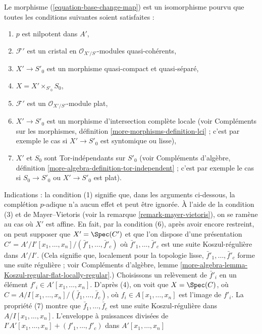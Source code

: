 \begin{remark}
\label{remark-base-change-isomorphism}
Le morphisme (\ref{equation-base-change-map}) est un isomorphisme pourvu que
toutes les conditions suivantes soient satisfaites :
\begin{enumerate}
\item $p$ est nilpotent dans $A'$,
\item $\mathcal{F}'$ est un cristal en
$\mathcal{O}_{X'/S'}$-modules quasi-cohérents,
\item $X' \to S'_0$ est un morphisme quasi-compact et quasi-séparé,
\item $X = X' \times_{S'_0} S_0$,
\item $\mathcal{F}'$ est un $\mathcal{O}_{X'/S'}$-module plat,
\item $X' \to S'_0$ est un morphisme d'intersection complète locale (voir
Compléments sur les morphismes, définition \ref{more-morphisms-definition-lci} ; c'est
par exemple le cas si $X' \to S'_0$ est syntomique ou lisse),
\item $X'$ et $S_0$ sont Tor-indépendants sur $S'_0$ (voir
Compléments d'algèbre, définition \ref{more-algebra-definition-tor-independent} ;
c'est par exemple le cas si $S_0 \to S'_0$ ou $X' \to S'_0$ est plat).
\end{enumerate}
Indications : la condition (1) signifie que, dans les arguments ci-dessous, la complétion $p$-adique
n'a aucun effet et peut être ignorée.
À l'aide de la condition (3) et de Mayer--Vietoris (voir la
remarque \ref{remark-mayer-vietoris}), on se ramène au cas
où $X'$ est affine. En fait, par la condition (6), après avoir encore restreint,
on peut supposer que $X' = \Spec(C')$ et que l'on dispose d'une présentation
$C' = A'/I'[x_1, \ldots, x_n]/(\bar f'_1, \ldots, \bar f'_c)$
où $\bar f'_1, \ldots, \bar f'_c$ est une suite Koszul-régulière dans $A'/I'$.
(Cela signifie que, localement pour la topologie lisse, $\bar f'_1, \ldots, \bar f'_c$ forme
une suite régulière ; voir Compléments d'algèbre,
lemme \ref{more-algebra-lemma-Koszul-regular-flat-locally-regular}.)
Choisissons un relèvement de
$\bar f'_i$ en un élément $f'_i \in A'[x_1, \ldots, x_n]$. D'après (4), on voit que
$X = \Spec(C)$, où $C = A/I[x_1, \ldots, x_n]/(\bar f_1, \ldots, \bar f_c)$,
où $f_i \in A[x_1, \ldots, x_n]$ est l'image de $f'_i$.
La propriété (7) montre que $\bar f_1, \ldots, \bar f_c$ est une suite Koszul-régulière
dans $A/I[x_1, \ldots, x_n]$. L'enveloppe à puissances divisées de
$I'A'[x_1, \ldots, x_n] + (f'_1, \ldots, f'_c)$ dans $A'[x_1, \ldots, x_n]$

\end{remark}
